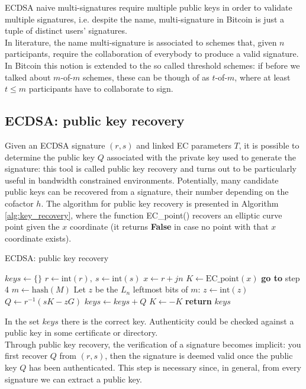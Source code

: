 \bigskip
\noindent
ECDSA naive multi-signatures require multiple public keys in order to validate multiple signatures, i.e. despite the name, multi-signature in Bitcoin is just a tuple of distinct users' signatures.
\\
In literature, the name multi-signature is associated to schemes that, given $n$ participants, require the collaboration of everybody to produce a valid signature. In Bitcoin this notion is extended to the so called threshold schemes: if before we talked about $m$-of-$m$ schemes, these can be though of as $t$-of-$m$, where at least $t \leq m$ participants have to collaborate to sign.

\bigskip

\subsection{ECDSA: public key recovery}
Given an ECDSA signature $(r, s)$ and linked EC parameters $T$, it is possible to determine the public key $Q$ associated with the private key used to generate the signature: this tool is called public key recovery and turns out to be particularly useful in bandwidth constrained environments. Potentially, many candidate public keys can be recovered from a signature, their number depending on the cofactor $h$. The algorithm for public key recovery is presented in Algorithm \ref{alg:key_recovery}, where the function EC\_point() recovers an elliptic curve point given the $x$ coordinate (it returns \textbf{False} in case no point with that $x$ coordinate exists).

\bigskip

\begin{algorithm}
	\caption{ECDSA: public key recovery}
	\label{alg:key_recovery}
	\begin{algorithmic}[1]
		\State $keys \gets \{\}$
		\State $r \gets \text{int}(r), \ s \gets \text{int}(s)$
		\State $x \gets r + jn$
		\State $K \gets \text{EC\_point}(x)$
		\State \textbf{go to} step 4
		\EndIf
		\State $m \gets \text{hash}(M)$
		\State Let $z$ be the $L_n$ leftmost bits of $m$: $z \gets \text{int}(z)$
		\State $Q \gets r^{-1}(sK - zG)$
		\State $keys \gets keys + Q$
		\State $K \gets -K$
		\EndFor
		\EndFor
		\State \textbf{return} $keys$
		\EndProcedure
	\end{algorithmic}
\end{algorithm}
\noindent
In the set $keys$ there is the correct key. Authenticity could be checked against a public key in some certificate or directory.
\\
Through public key recovery, the verification of a signature becomes implicit: you first recover $Q$ from $(r, s)$, then the signature is deemed valid once the public key $Q$ has been authenticated. This step is necessary since, in general, from every signature we can extract a public key.

